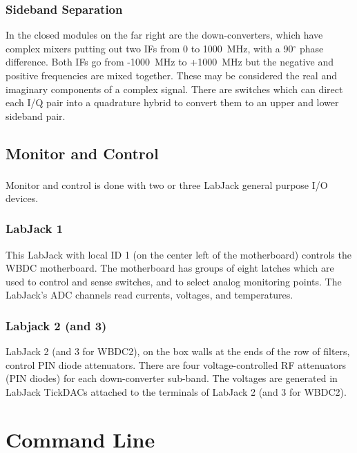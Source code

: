 \documentclass[letterpaper,11pt]{book}
\begin{document}
\subsection{Sideband Separation}

In the closed modules on the far right are the down-converters, which have 
complex mixers putting out two IFs
from 0 to 1000~MHz, with a 90$^{\circ}$ phase difference.
Both IFs go from -1000~MHz to +1000~MHz but the negative and positive
frequencies are mixed together.
These may be considered the real and imaginary components of
a complex signal.
There are switches which can direct each I/Q pair into a quadrature
hybrid to convert them to an upper and lower sideband pair.

\section{Monitor and Control}

Monitor and control is done with two or three 
LabJack\textsuperscript{\textregistered} general purpose I/O devices. 

\subsection{LabJack 1}

This LabJack with local ID 1 (on the center left of the motherboard) controls 
the WBDC motherboard.   The motherboard has groups of
eight latches which are used to control and sense switches, and to select
analog monitoring points.  The LabJack's ADC channels read currents, voltages, 
and temperatures. 

\subsection{Labjack 2 (and 3)}

LabJack 2 (and 3 for WBDC2), on the box walls at the ends of the row of 
filters, control PIN diode attenuators.
There are four voltage-controlled RF attenuators (PIN diodes) for each
down-converter sub-band.  The voltages are generated in LabJack
TickDACs attached to the terminals of LabJack 2 (and 3 for WBDC2).


\chapter{Command Line}\label{chap:cmd-line}
\end{document}
